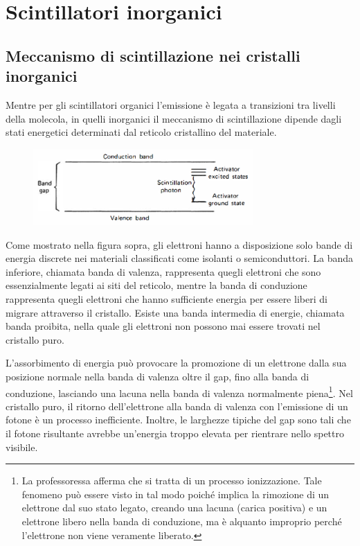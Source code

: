 \section{Scintillatori inorganici}


\subsection{Meccanismo di scintillazione nei cristalli inorganici}
Mentre per gli scintillatori organici l'emissione è legata a transizioni tra livelli della molecola, in quelli inorganici il meccanismo di scintillazione dipende dagli stati energetici determinati dal reticolo cristallino del materiale.
\begin{figure}[H]
   \centering
   \includegraphics[width=0.75\textwidth]{immagini/Livelli_energetici_scintillatori_inorganici.png}
\end{figure}
Come mostrato nella figura sopra, gli elettroni hanno a disposizione solo bande di energia discrete nei materiali classificati come isolanti o semiconduttori. La banda inferiore, chiamata banda di valenza, rappresenta quegli elettroni che sono essenzialmente legati ai siti del reticolo, mentre la banda di conduzione rappresenta quegli elettroni che hanno sufficiente energia per essere liberi di migrare attraverso il cristallo. Esiste una banda intermedia di energie, chiamata banda proibita, nella quale gli elettroni non possono mai essere trovati nel cristallo puro.

L'assorbimento di energia può provocare la promozione di un elettrone dalla sua posizione normale nella banda di valenza oltre il gap, fino alla banda di conduzione, lasciando una lacuna nella banda di valenza normalmente piena\footnote{La professoressa afferma che si tratta di un processo ionizzazione. Tale fenomeno può essere visto in tal modo poiché implica la rimozione di un elettrone dal suo stato legato, creando una lacuna (carica positiva) e un elettrone libero nella banda di conduzione, ma è alquanto improprio perché l'elettrone non viene veramente liberato.}. Nel cristallo puro, il ritorno dell'elettrone alla banda di valenza con l'emissione di un fotone è un processo inefficiente. Inoltre, le larghezze tipiche del gap sono tali che il fotone risultante avrebbe un'energia troppo elevata per rientrare nello spettro visibile.

